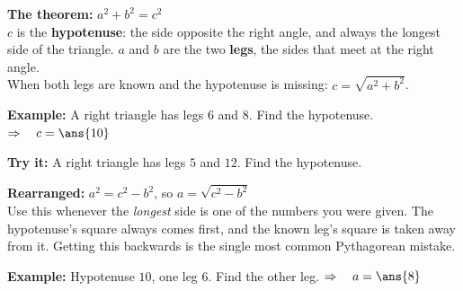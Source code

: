 \documentclass[12pt]{article}
\begin{document}


\begin{formulabox}
\textbf{The theorem:} \quad $a^2 + b^2 = c^2$\\[3pt]
$c$ is the \textbf{hypotenuse}: the side opposite the right angle, and always the longest side of
the triangle. $a$ and $b$ are the two \textbf{legs}, the sides that meet at the right angle.\\[3pt]
When both legs are known and the hypotenuse is missing: $c = \sqrt{a^2 + b^2}$.
\end{formulabox}

\begin{examplebox}
\textbf{Example:} \quad A right triangle has legs $6$ and $8$. Find the hypotenuse.
$\Rightarrow\quad c = \ans{10}$
\end{examplebox}

\begin{tryitbox}
\textbf{Try it:} \quad A right triangle has legs $5$ and $12$. Find the hypotenuse.\\[2pt]
\end{tryitbox}


\begin{formulabox}
\textbf{Rearranged:} \quad $a^2 = c^2 - b^2$, \quad so \quad $a = \sqrt{c^2 - b^2}$\\[3pt]
Use this whenever the \textit{longest} side is one of the numbers you were given. The
hypotenuse's square always comes first, and the known leg's square is taken away from it. Getting
this backwards is the single most common Pythagorean mistake.
\end{formulabox}

\begin{examplebox}
\textbf{Example:} \quad Hypotenuse $10$, one leg $6$. Find the other leg.
$\Rightarrow\quad a = \ans{8}$
\end{examplebox}
\end{document}
